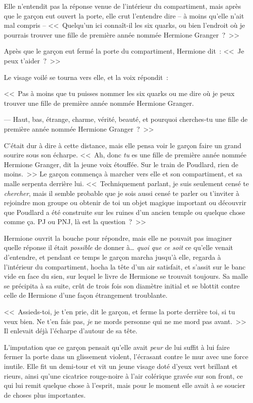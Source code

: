 Elle n'entendit pas la réponse venue de l'intérieur du compartiment, mais après que le garçon eut ouvert la porte, elle crut l'entendre dire -- à moins qu'elle n'ait mal compris -- <<~Quelqu'un ici connaît-il les six quarks, ou bien l'endroit où je pourrais trouver une fille de première année nommée Hermione Granger~?~>>

Après que le garçon eut fermé la porte du compartiment, Hermione dit~: <<~Je peux t'aider~?~>>

Le visage voilé se tourna vers elle, et la voix répondit~:

<<~Pas à moins que tu puisses nommer les six quarks ou me dire où je peux trouver une fille de première année nommée Hermione Granger.

--- Haut, bas, étrange, charme, vérité, beauté, et pourquoi cherches-tu une fille de première année nommée Hermione Granger~?~>>

C'était dur à dire à cette distance, mais elle pensa voir le garçon faire un grand sourire sous son écharpe. <<~Ah, donc \emph{tu} es une fille de première année nommée Hermione Granger, dit la jeune voix étouffée. Sur le train de Poudlard, rien de moins.~>> Le garçon commença à marcher vers elle et son compartiment, et sa malle serpenta derrière lui. <<~Techniquement parlant, je suis seulement censé te \emph{chercher}, mais il semble probable que je sois aussi censé te parler ou t'inviter à rejoindre mon groupe ou obtenir de toi un objet magique important ou découvrir que Poudlard a été construite sur les ruines d'un ancien temple ou quelque chose comme ça. PJ ou PNJ, là est la question~?~>>

Hermione ouvrit la bouche pour répondre, mais elle ne pouvait pas imaginer quelle réponse il était \emph{possible} de donner à… \emph{quoi que ce soit} ce qu'elle venait d'entendre, et pendant ce temps le garçon marcha jusqu'à elle, regarda à l'intérieur du compartiment, hocha la tête d'un air satisfait, et s'assit sur le banc vide en face du sien, sur lequel le livre de Hermione se trouvait toujours. Sa malle se précipita à sa suite, crût de trois fois son diamètre initial et se blottit contre celle de Hermione d'une façon étrangement troublante.

<<~Assieds-toi, je t'en prie, dit le garçon, et ferme la porte derrière toi, si tu veux bien. Ne t'en fais pas, \emph{je} ne mords personne qui ne me mord pas avant.~>> Il enlevait déjà l'écharpe d'autour de sa tête.

L'imputation que ce garçon pensait qu'elle avait \emph{peur} de lui suffit à lui faire fermer la porte dans un glissement violent, l'écrasant contre le mur avec une force inutile. Elle fit un demi-tour et vit un jeune visage doté d'yeux vert brillant et rieurs, ainsi qu'une cicatrice rouge-noire à l'air colérique gravée sur son front, ce qui lui remit quelque chose à l'esprit, mais pour le moment elle avait à se soucier de choses plus importantes.


